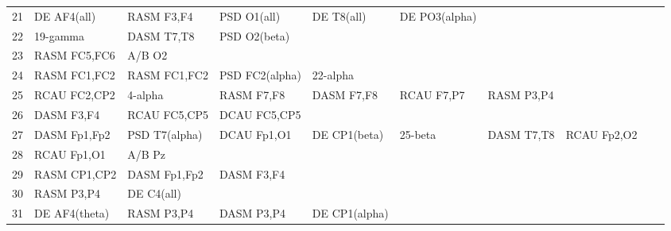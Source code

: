 \begin{landscape}
\begin{table}[]
\begin{tabular}{l|llllllll}
21       & DE AF4(all)    & RASM F3,F4     & PSD O1(all)    & DE T8(all)     & DE PO3(alpha)  &                &                &                &               &              \\
22       & 19-gamma       & DASM T7,T8     & PSD O2(beta)   &                &                &                &                &                &               &              \\
23       & RASM FC5,FC6   & A/B O2         &                &                &                &                &                &                &               &              \\
24       & RASM FC1,FC2   & RASM FC1,FC2   & PSD FC2(alpha) & 22-alpha       &                &                &                &                &               &              \\
25       & RCAU FC2,CP2   & 4-alpha        & RASM F7,F8     & DASM F7,F8     & RCAU F7,P7     & RASM P3,P4     &                &                &               &              \\
26       & DASM F3,F4     & RCAU FC5,CP5   & DCAU FC5,CP5   &                &                &                &                &                &               &              \\
27       & DASM Fp1,Fp2   & PSD T7(alpha)  & DCAU Fp1,O1    & DE CP1(beta)   & 25-beta        & DASM T7,T8     & RCAU Fp2,O2    &                &               &              \\
28       & RCAU Fp1,O1    & A/B Pz         &                &                &                &                &                &                &               &              \\
29       & RASM CP1,CP2   & DASM Fp1,Fp2   & DASM F3,F4     &                &                &                &                &                &               &              \\
30       & RASM P3,P4     & DE C4(all)     &                &                &                &                &                &                &               &              \\
31       & DE AF4(theta)  & RASM P3,P4     & DASM P3,P4     & DE CP1(alpha)  &                &                &                &                &               &              \\
\end{tabular}
\end{table}
\end{landscape}
\clearpage
